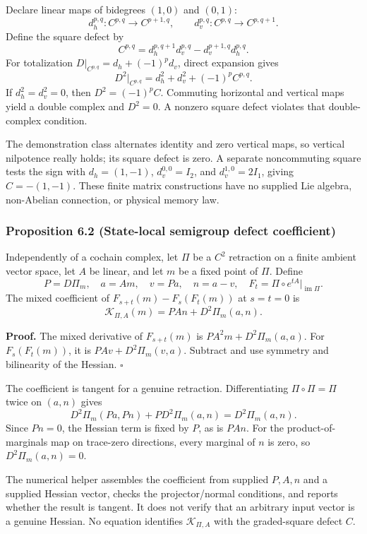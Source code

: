 \documentclass[
  11pt,
]{article}
\begin{document}
Declare linear maps of bidegrees \((1,0)\) and \((0,1)\):
\[
d_h^{p,q}:C^{p,q}\to C^{p+1,q},\qquad
d_v^{p,q}:C^{p,q}\to C^{p,q+1}.
\]
Define the square defect by
\[
C^{p,q}=
d_h^{p,q+1}d_v^{p,q}
-d_v^{p+1,q}d_h^{p,q}.
\]
For totalization \(D|_{C^{p,q}}=d_h+(-1)^p d_v\), direct expansion gives
\[
D^2|_{C^{p,q}}
=d_h^2+d_v^2+(-1)^p C^{p,q}.
\]
If \(d_h^2=d_v^2=0\), then \(D^2=(-1)^p C\).
Commuting horizontal and vertical maps yield a double complex and \(D^2=0\).
A nonzero square defect violates that double-complex condition.

The demonstration class alternates identity and zero vertical maps, so
vertical nilpotence really holds; its square defect is zero.
A separate noncommuting square tests the sign with
\(d_h=(1,-1)\), \(d_v^{0,0}=I_2\), and \(d_v^{1,0}=2I_1\), giving
\(C=-(1,-1)\).
These finite matrix constructions have no supplied Lie algebra, non-Abelian
connection, or physical memory law.

\subsubsection{Proposition 6.2 (State-local semigroup defect coefficient)}\label{proposition-6.2-state-local-semigroup-defect-coefficient}

Independently of a cochain complex, let \(\Pi\) be a \(C^2\) retraction on a
finite ambient vector space, let \(A\) be linear, and let \(m\) be a fixed
point of \(\Pi\). Define
\[
P=D\Pi_m,\quad a=Am,\quad v=Pa,\quad n=a-v,\quad
F_t=\Pi\circ e^{tA}|_{\operatorname{im}\Pi}.
\]
The mixed coefficient of
\(F_{s+t}(m)-F_s(F_t(m))\) at \(s=t=0\) is
\[
\mathcal K_{\Pi,A}(m)=PAn+D^2\Pi_m(a,n).
\]

\textbf{Proof.} The mixed derivative of \(F_{s+t}(m)\) is
\(PA^2m+D^2\Pi_m(a,a)\). For \(F_s(F_t(m))\), it is
\(PAv+D^2\Pi_m(v,a)\). Subtract and use symmetry and bilinearity of
the Hessian. \(\square\)

The coefficient is tangent for a genuine retraction.
Differentiating \(\Pi\circ\Pi=\Pi\) twice on \((a,n)\) gives
\[
D^2\Pi_m(Pa,Pn)+P D^2\Pi_m(a,n)=D^2\Pi_m(a,n).
\]
Since \(Pn=0\), the Hessian term is fixed by \(P\), as is \(PAn\).
For the product-of-marginals map on trace-zero directions, every marginal
of \(n\) is zero, so \(D^2\Pi_m(a,n)=0\).

The numerical helper assembles the coefficient from supplied \(P,A,n\) and
a supplied Hessian vector, checks the projector/normal conditions, and
reports whether the result is tangent. It does not verify that an arbitrary
input vector is a genuine Hessian. No equation identifies
\(\mathcal K_{\Pi,A}\) with the graded-square defect \(C\).
\end{document}
